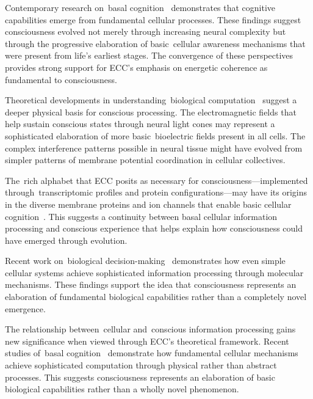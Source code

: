 Contemporary research on~basal cognition~\cite{Levin2019, lyon2021reframing} demonstrates that cognitive capabilities emerge from fundamental cellular processes. These findings suggest consciousness evolved not merely through increasing neural complexity but through the progressive elaboration of basic~cellular awareness mechanisms that were present from life's earliest stages. The convergence of these perspectives provides strong support for ECC's emphasis on energetic coherence as fundamental to consciousness.

Theoretical developments in understanding~biological computation~\cite{Levin2018, akhlaghpour2022rna} suggest a deeper physical basis for conscious processing. The electromagnetic fields that help sustain conscious states through neural light cones may represent a sophisticated elaboration of more basic~bioelectric fields present in all cells. The complex interference patterns possible in neural tissue might have evolved from simpler patterns of membrane potential coordination in cellular collectives.

The~rich alphabet that ECC posits as necessary for consciousness—implemented through~transcriptomic profiles and protein configurations—may have its origins in the diverse membrane proteins and ion channels that enable basic cellular cognition~\cite{Fields2020, gershman2023molecular}. This suggests a continuity between basal cellular information processing and conscious experience that helps explain how consciousness could have emerged through evolution.

Recent work on~biological decision-making~\cite{Mitchell2016, Manicka2019} demonstrates how even simple cellular systems achieve sophisticated information processing through molecular mechanisms. These findings support the idea that consciousness represents an elaboration of fundamental biological capabilities rather than a completely novel emergence.

The relationship between~cellular and~conscious information processing gains new significance when viewed through ECC's theoretical framework. Recent studies of~basal cognition~\cite{Levin2018, lyon2021reframing} demonstrate how fundamental cellular mechanisms achieve sophisticated computation through physical rather than abstract processes. This suggests consciousness represents an elaboration of basic biological capabilities rather than a wholly novel phenomenon.

